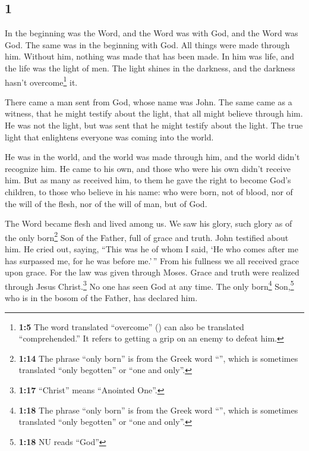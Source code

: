\begin{paracol}{2}
\switchcolumn
\begin{otherlanguage}{english}

\hypertarget{section-1}{%
\section{1}\label{section-1}}

 In the beginning was the Word, and the Word was with God,
and the Word was God.  The same was in the beginning with
God.  All things were made through him. Without him,
nothing was made that has been made.  In him was life, and
the life was the light of men.  The light shines in the
darkness, and the darkness hasn't overcome\footnote{\textbf{1:5} The
  word translated ``overcome'' () can also be
  translated ``comprehended.'' It refers to getting a grip on an enemy
  to defeat him.} it.

 There came a man sent from God, whose name was John.
 The same came as a witness, that he might testify about
the light, that all might believe through him.  He was not
the light, but was sent that he might testify about the light.
 The true light that enlightens everyone was coming into
the world.

 He was in the world, and the world was made through him,
and the world didn't recognize him.  He came to his own,
and those who were his own didn't receive him.  But as
many as received him, to them he gave the right to become God's
children, to those who believe in his name:  who were
born, not of blood, nor of the will of the flesh, nor of the will of
man, but of God.

 The Word became flesh and lived among us. We saw his
glory, such glory as of the only born\footnote{\textbf{1:14} The phrase
  ``only born'' is from the Greek word ``'', which is
  sometimes translated ``only begotten'' or ``one and only''.} Son of
the Father, full of grace and truth.  John testified
about him. He cried out, saying, ``This was he of whom I said, `He who
comes after me has surpassed me, for he was before me.'\,''
 From his fullness we all received grace upon grace.
 For the law was given through Moses. Grace and truth
were realized through Jesus Christ.\footnote{\textbf{1:17} ``Christ''
  means ``Anointed One''.}  No one has seen God at any
time. The only born\footnote{\textbf{1:18} The phrase ``only born'' is
  from the Greek word ``'', which is sometimes
  translated ``only begotten'' or ``one and only''.} Son,\footnote{\textbf{1:18}
  NU reads ``God''} who is in the bosom of the Father, has declared him.


\end{otherlanguage}
\end{paracol}
